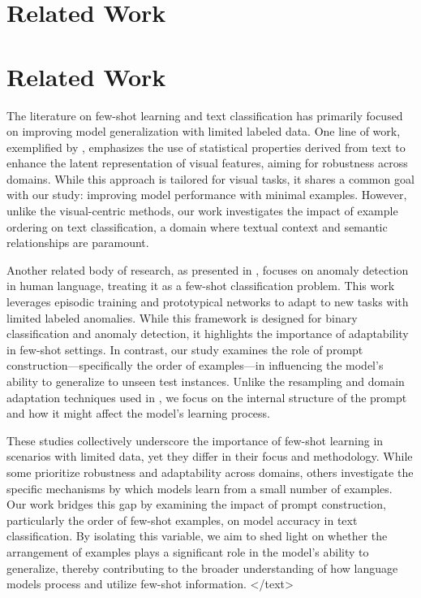 \documentclass{article}
\begin{document}
\section{Related Work}
\section*{Related Work}

The literature on few-shot learning and text classification has primarily focused on improving model generalization with limited labeled data. One line of work, exemplified by \cite{2311.14544v1}, emphasizes the use of statistical properties derived from text to enhance the latent representation of visual features, aiming for robustness across domains. While this approach is tailored for visual tasks, it shares a common goal with our study: improving model performance with minimal examples. However, unlike the visual-centric methods, our work investigates the impact of example ordering on text classification, a domain where textual context and semantic relationships are paramount.

Another related body of research, as presented in \cite{2507.20019v1}, focuses on anomaly detection in human language, treating it as a few-shot classification problem. This work leverages episodic training and prototypical networks to adapt to new tasks with limited labeled anomalies. While this framework is designed for binary classification and anomaly detection, it highlights the importance of adaptability in few-shot settings. In contrast, our study examines the role of prompt construction—specifically the order of examples—in influencing the model's ability to generalize to unseen test instances. Unlike the resampling and domain adaptation techniques used in \cite{2507.20019v1}, we focus on the internal structure of the prompt and how it might affect the model's learning process.

These studies collectively underscore the importance of few-shot learning in scenarios with limited data, yet they differ in their focus and methodology. While some prioritize robustness and adaptability across domains, others investigate the specific mechanisms by which models learn from a small number of examples. Our work bridges this gap by examining the impact of prompt construction, particularly the order of few-shot examples, on model accuracy in text classification. By isolating this variable, we aim to shed light on whether the arrangement of examples plays a significant role in the model's ability to generalize, thereby contributing to the broader understanding of how language models process and utilize few-shot information.
</text>
\end{document}
